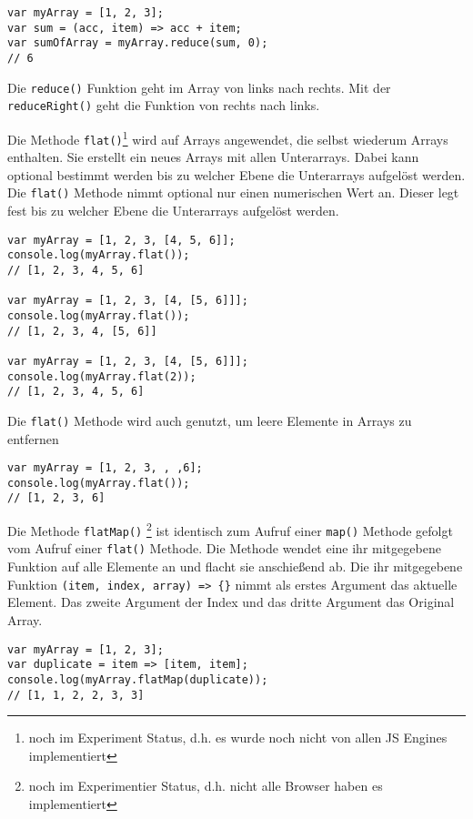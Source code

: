 \documentclass{book}
\begin{document}
\begin{lstlisting}[caption=Array Konstruktor]
var myArray = [1, 2, 3];
var sum = (acc, item) => acc + item;
var sumOfArray = myArray.reduce(sum, 0);
// 6
\end{lstlisting}

Die \lstinline|reduce()| Funktion geht im Array von links nach rechts. Mit der \lstinline|reduceRight()| geht die Funktion von rechts nach links.

Die Methode \lstinline|flat()|\footnote{noch im Experiment Status, d.h. es wurde noch nicht von allen JS Engines implementiert} wird auf Arrays angewendet, die selbst wiederum Arrays enthalten. Sie erstellt ein neues Arrays mit allen Unterarrays. Dabei kann optional bestimmt werden bis zu welcher Ebene die Unterarrays aufgelöst werden. Die \lstinline|flat()| Methode nimmt optional nur einen numerischen Wert an. Dieser legt fest bis zu welcher Ebene die Unterarrays aufgelöst werden.

\begin{lstlisting}[caption=Array Konstruktor]
var myArray = [1, 2, 3, [4, 5, 6]];
console.log(myArray.flat());
// [1, 2, 3, 4, 5, 6]

var myArray = [1, 2, 3, [4, [5, 6]]];
console.log(myArray.flat());
// [1, 2, 3, 4, [5, 6]]

var myArray = [1, 2, 3, [4, [5, 6]]];
console.log(myArray.flat(2));
// [1, 2, 3, 4, 5, 6]

\end{lstlisting}

Die \lstinline|flat()| Methode wird auch genutzt, um leere Elemente in Arrays zu entfernen
\begin{lstlisting}[caption=Array Konstruktor]
var myArray = [1, 2, 3, , ,6];
console.log(myArray.flat());
// [1, 2, 3, 6]
\end{lstlisting}

Die Methode \lstinline|flatMap()| \footnote{noch im Experimentier Status, d.h. nicht alle Browser haben es implementiert} ist identisch zum Aufruf einer \lstinline|map()| Methode gefolgt vom Aufruf einer \lstinline|flat()| Methode. Die Methode wendet eine ihr mitgegebene Funktion auf alle Elemente an und flacht sie anschießend ab. Die ihr mitgegebene Funktion \lstinline|(item, index, array) => {}| nimmt als erstes Argument das aktuelle Element. Das zweite Argument der Index und das dritte Argument das Original Array.

\begin{lstlisting}[caption=Array Konstruktor]
var myArray = [1, 2, 3];
var duplicate = item => [item, item];
console.log(myArray.flatMap(duplicate));
// [1, 1, 2, 2, 3, 3]
\end{lstlisting}
\end{document}
